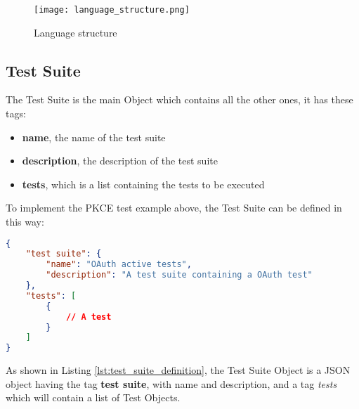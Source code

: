 \begin{figure}
    \texttt{[image: language\_structure.png]}
    \caption{Language structure}
    \label{fig:language_structure}
\end{figure}

\subsection{Test Suite}
The Test Suite is the main Object which contains all the other ones, it has these tags:

\begin{itemize}
    \item \textbf{name}, the name of the test suite
    \item \textbf{description}, the description of the test suite
    \item \textbf{tests}, which is a list containing the tests to be executed
\end{itemize}
To implement the \gls{PKCE} test example above, the Test Suite can be defined in this way:

\begin{lstlisting}[language=json, caption=Test Suite definition, label={lst:test_suite_definition}]
{
    "test suite": {
        "name": "OAuth active tests",
        "description": "A test suite containing a OAuth test"
    },
    "tests": [
        {
            // A test
        }
    ]
}
\end{lstlisting}

As shown in Listing \ref{lst:test_suite_definition}, the Test Suite Object is a JSON object having the tag \textbf{test suite}, with name and description, and a tag \textit{tests} which will contain a list of Test Objects.

